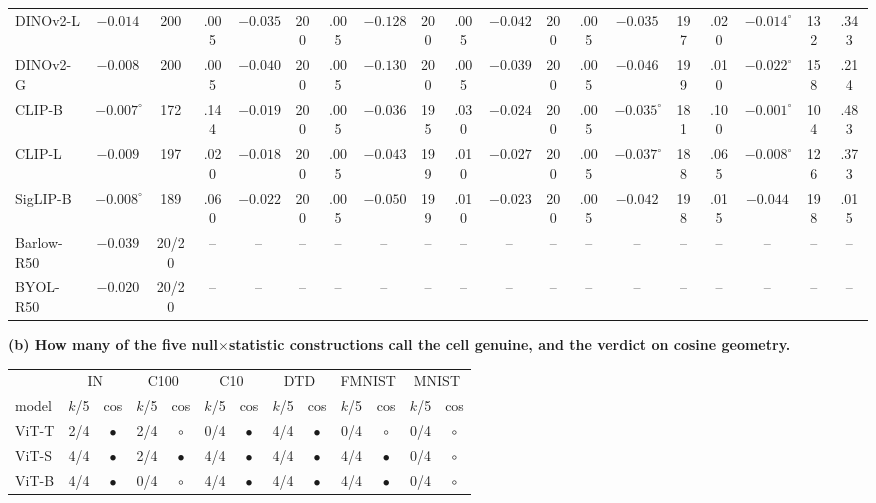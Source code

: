 \begin{table}[H]
\begin{tabular}{lcccccccccccccccccc}
DINOv2-L & $-0.014$ & 200 & .005 & $-0.035$ & 200 & .005 & $-0.128$ & 200 & .005 & $-0.042$ & 200 & .005 & $-0.035$ & 197 & .020 & $-0.014^{\circ}$ & 132 & .343 \\
DINOv2-G & $-0.008$ & 200 & .005 & $-0.040$ & 200 & .005 & $-0.130$ & 200 & .005 & $-0.039$ & 200 & .005 & $-0.046$ & 199 & .010 & $-0.022^{\circ}$ & 158 & .214 \\
\midrule
CLIP-B & $-0.007^{\circ}$ & 172 & .144 & $-0.019$ & 200 & .005 & $-0.036$ & 195 & .030 & $-0.024$ & 200 & .005 & $-0.035^{\circ}$ & 181 & .100 & $-0.001^{\circ}$ & 104 & .483 \\
CLIP-L & $-0.009$ & 197 & .020 & $-0.018$ & 200 & .005 & $-0.043$ & 199 & .010 & $-0.027$ & 200 & .005 & $-0.037^{\circ}$ & 188 & .065 & $-0.008^{\circ}$ & 126 & .373 \\
SigLIP-B & $-0.008^{\circ}$ & 189 & .060 & $-0.022$ & 200 & .005 & $-0.050$ & 199 & .010 & $-0.023$ & 200 & .005 & $-0.042$ & 198 & .015 & $-0.044$ & 198 & .015 \\
Barlow-R50 & $-0.039$ & 20/20 & -- & -- & -- & -- & -- & -- & -- & -- & -- & -- & -- & -- & -- & -- & -- & -- \\
BYOL-R50 & $-0.020$ & 20/20 & -- & -- & -- & -- & -- & -- & -- & -- & -- & -- & -- & -- & -- & -- & -- & -- \\
\bottomrule
\end{tabular}
\par\vspace{5pt}
\begingroup
\noindent\textbf{(b) How many of the five null$\times$statistic constructions call the cell genuine, and the verdict on cosine geometry.}\par\vspace{1.5pt}
\setlength{\tabcolsep}{2.4pt}
\begin{tabular}{lcccccccccccc}
\toprule
 & \multicolumn{2}{c}{IN} & \multicolumn{2}{c}{C100} & \multicolumn{2}{c}{C10} & \multicolumn{2}{c}{DTD} & \multicolumn{2}{c}{FMNIST} & \multicolumn{2}{c}{MNIST} \\
model & $k$/5 & cos & $k$/5 & cos & $k$/5 & cos & $k$/5 & cos & $k$/5 & cos & $k$/5 & cos \\
\midrule
ViT-T & 2/4 & $\bullet$ & 2/4 & $\circ$ & 0/4 & $\bullet$ & 4/4 & $\bullet$ & 0/4 & $\circ$ & 0/4 & $\circ$ \\
ViT-S & 4/4 & $\bullet$ & 2/4 & $\bullet$ & 4/4 & $\bullet$ & 4/4 & $\bullet$ & 4/4 & $\bullet$ & 0/4 & $\circ$ \\
ViT-B & 4/4 & $\bullet$ & 0/4 & $\circ$ & 4/4 & $\bullet$ & 4/4 & $\bullet$ & 4/4 & $\bullet$ & 0/4 & $\circ$ \\

\end{tabular}
\end{table}
